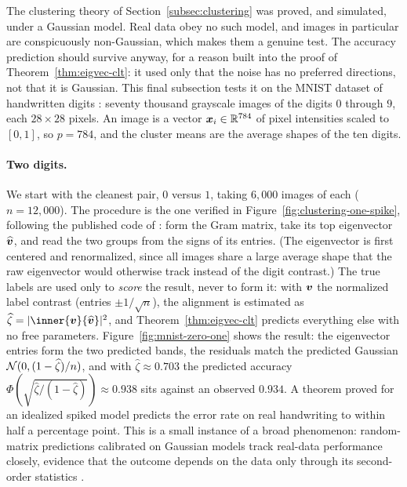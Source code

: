 The clustering theory of Section~\ref{subsec:clustering} was proved, and simulated, under a Gaussian model. Real data obey no such model, and images in particular are conspicuously non-Gaussian, which makes them a genuine test. The accuracy prediction should survive anyway, for a reason built into the proof of Theorem~\ref{thm:eigvec-clt}: it used only that the noise has no preferred directions, not that it is Gaussian. This final subsection tests it on the MNIST dataset of handwritten digits \citep[e.g.,][]{LeCun1998}: seventy thousand grayscale images of the digits \(0\) through \(9\), each \(28 \times 28\) pixels. An image is a vector \(\bm{x}_i \in \mathbb{R}^{784}\) of pixel intensities scaled to \([0, 1]\), so \(p = 784\), and the cluster means are the average shapes of the ten digits.

\paragraph{Two digits.}
We start with the cleanest pair, \(0\) versus \(1\), taking \(6{,}000\) images of each (\(n = 12{,}000\)). The procedure is the one verified in Figure~\ref{fig:clustering-one-spike}, following the published code of \citet{LebeauChatelainCouillet2024}: form the Gram matrix, take its top eigenvector \(\widehat{\bm{v}}\), and read the two groups from the signs of its entries. (The eigenvector is first centered and renormalized, since all images share a large average shape that the raw eigenvector would otherwise track instead of the digit contrast.) The true labels are used only to \emph{score} the result, never to form it: with \(\bm{v}\) the normalized label contrast (entries \(\pm 1/\sqrt{n}\)), the alignment is estimated as \(\widehat{\zeta} = \abs{\inner{\vect{v}}{\widehat{\vect{v}}}}^2\), and Theorem~\ref{thm:eigvec-clt} predicts everything else with no free parameters. Figure~\ref{fig:mnist-zero-one} shows the result: the eigenvector entries form the two predicted bands, the residuals match the predicted Gaussian \(\mathcal{N}(0, (1 - \widehat{\zeta})/n)\), and with \(\widehat{\zeta} \approx 0.703\) the predicted accuracy \(\Phi(\sqrt{\widehat{\zeta}/(1-\widehat{\zeta})}) \approx 0.938\) sits against an observed \(0.934\). A theorem proved for an idealized spiked model predicts the error rate on real handwriting to within half a percentage point. This is a small instance of a broad phenomenon: random-matrix predictions calibrated on Gaussian models track real-data performance closely, evidence that the outcome depends on the data only through its second-order statistics \citep{CouilletLiao2022}.

